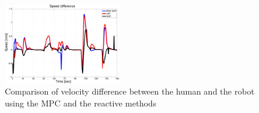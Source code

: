 \documentclass[letterpaper, 10 pt, conference]{ieeeconf}
\begin{document}
	\begin{figure}
		\centering
		\includegraphics[width=0.45\textwidth]{figures/vel_diff2.pdf}
		\caption{Comparison of velocity difference between the human and the robot using the MPC and the reactive methods}
		\label{fig:err_v}
	\end{figure}
	
	
\end{document}
